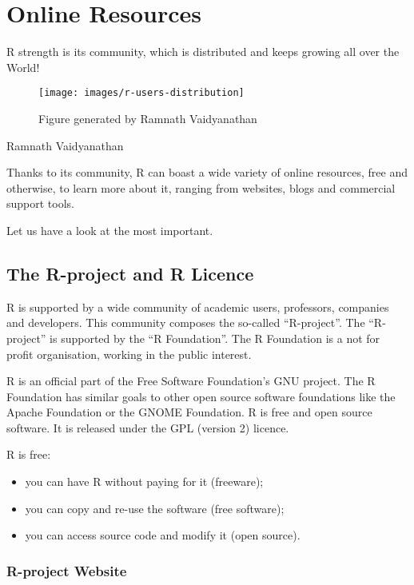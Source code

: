 \documentclass[]{book}
\providecommand{\tightlist}{%
  \setlength{\itemsep}{0pt}\setlength{\parskip}{0pt}}
\def\tightlist{}
\begin{document}
\chapter{Online Resources}\label{online-resources}

R strength is its community, which is distributed and keeps growing all
over the World!

\begin{figure}

{\centering \texttt{[image: images/r-users-distribution]} 

}

\caption{Figure generated by Ramnath Vaidyanathan}\label{fig:g1}
\end{figure}

Ramnath Vaidyanathan

Thanks to its community, R can boast a wide variety of online resources,
free and otherwise, to learn more about it, ranging from websites, blogs
and commercial support tools.

Let us have a look at the most important.

\section{The R-project and R Licence}\label{the-r-project-and-r-licence}

R is supported by a wide community of academic users, professors,
companies and developers. This community composes the so-called
``R-project''. The ``R-project'' is supported by the ``R Foundation''.
The R Foundation is a not for profit organisation, working in the public
interest.

R is an official part of the Free Software Foundation's GNU project. The
R Foundation has similar goals to other open source software foundations
like the Apache Foundation or the GNOME Foundation. R is free and open
source software. It is released under the GPL (version 2) licence.

R is free:

\begin{itemize}
\tightlist
\item
  you can have R without paying for it (freeware);
\item
  you can copy and re-use the software (free software);
\item
  you can access source code and modify it (open source).
\end{itemize}

\subsection{R-project Website}\label{r-project-website}
\end{document}
